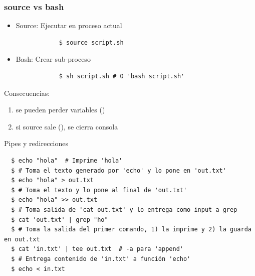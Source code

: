 \documentclass[14pt,aspectratio=169,xcolor=dvipsnames]{beamer}
\begin{document}
\begin{frame}[fragile]\frametitle{source vs bash}
    \begin{itemize}
        \item Source: Ejecutar en proceso actual
        \begin{verbatim}
            $ source script.sh
        \end{verbatim}
        \item Bash: Crear sub-proceso
        \begin{verbatim}
            $ sh script.sh # O 'bash script.sh'
        \end{verbatim}
    \end{itemize}

Consecuencias: 
    \begin{enumerate}
        \item se pueden perder variables ()
        \item  si source sale (), se cierra consola
    \end{enumerate}


\end{frame}
\begin{frame}[fragile]{Pipes y redirecciones}
    \begin{footnotesize}
    \begin{verbatim}
  $ echo "hola"  # Imprime 'hola'
  $ # Toma el texto generado por 'echo' y lo pone en 'out.txt'
  $ echo "hola" > out.txt 
  $ # Toma el texto y lo pone al final de 'out.txt'
  $ echo "hola" >> out.txt 
  $ # Toma salida de 'cat out.txt' y lo entrega como input a grep
  $ cat 'out.txt' | grep "ho"
  $ # Toma la salida del primer comando, 1) la imprime y 2) la guarda en out.txt
  $ cat 'in.txt' | tee out.txt  # -a para 'append'
  $ # Entrega contenido de 'in.txt' a función 'echo'
  $ echo < in.txt
    \end{verbatim} 
    \end{footnotesize}

\end{frame}
\end{document}
